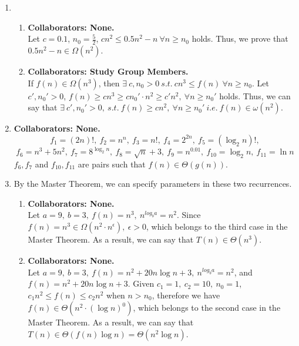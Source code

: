 \documentclass[a4paper,12pt]{article}
\begin{document}
\begin{enumerate}

\item {
\begin{enumerate}
    \item { \textbf{Collaborators: None.} \\
Let $c=0.1$, $n_0=\frac{5}{2}$, $cn^2 \leq 0.5n^2-n \ \forall n \geq n_0$ holds. Thus, we prove that $0.5n^2 - n \in \Omega (n^2)$.
    }
    \item{ \textbf{Collaborators: Study Group Members.}\\
If $f(n) \in \Omega (n^3)$, then $ \exists \ c, n_0>0 \ s.t. \ cn^3 \leq f(n) \ \forall n \geq n_0 $. Let $c', n_0' > 0$, $f(n) \geq cn^3 \geq cn_0'\cdot n^2 \geq c'n^2, \ \forall n \geq n_0'$ holds. Thus, we can say that $\exists \ c', n_0'>0, \ s.t. \ f(n) \geq cn^2, \ \forall n \geq n_0' \ i.e. \ f(n) \in \omega (n^2)$.
    }
\end{enumerate}
}

\item{ \textbf{Collaborators: None.}
\[
f_1=(2n)!, \ f_2 = n^n, \ f_3 = n!, \ f_4 = 2^{2n}, \ f_5 = (\log _2 n)!,\]
\[f_6 = n^3+5n^2, \ f_7 = 8^{\log _2 n}, \ f_8 = \sqrt{n}+3, \ f_9 = n^{0.01}, \ f_{10} = \log _2 n, \ f_{11} = \ln n
\]
$f_6,f_7$ and $f_{10},f_{11}$ are pairs such that $f(n) \in \Theta (g(n))$.
}

\item {
By the Master Theorem, we can specify parameters in these two recurrences.
\begin{enumerate}
    \item{ \textbf{Collaborators: None.} \\
Let $a=9, \ b=3, \ f(n)=n^3,\ n^{log_ba}=n^2$. Since $f(n)=n^3 \in \Omega (n^2 \cdot n^\epsilon ), \ \epsilon > 0$, which belongs to the third case in the Master Theorem. As a result, we can say that $T(n) \in \Theta (n^3)$.
    }
    \item{ \textbf{Collaborators: None.} \\
Let $a=9, \ b=3, \ f(n)=n^2 + 20n \log n + 3,\ n^{log_ba}=n^2$, and $f(n) = n^2+20n\log n +3$.  
Given $c_1 = 1, \ c_2 = 10, \ n_0 = 1$, $c_1n^2 \leq f(n) \leq c_2n^2$ when $n>n_0$, therefore we have $f(n) \in \Theta (n^2\cdot (\log n)^0)$, which belongs to the second case in the Master Theorem. As a result, we can say that $T(n) \in \Theta (f(n)\log n) = \Theta (n^2\log n) $.
    }
\end{enumerate}
}


\end{enumerate}
\end{document}
